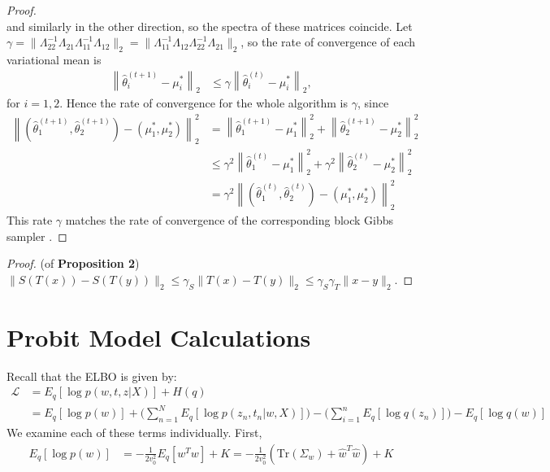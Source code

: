 \documentclass{article}
\begin{document}
\begin{proof}
$$$$
\noindent and similarly in the other direction, so the spectra of these matrices coincide. Let $\gamma = \|\Lambda_{22}^{-1}\Lambda_{21}\Lambda_{11}^{-1}\Lambda_{12}\|_2 = \|\Lambda_{11}^{-1}\Lambda_{12}\Lambda_{22}^{-1}\Lambda_{21}\|_2$, so the rate of convergence of each variational mean is
\begin{align}
\left\|\widehat\theta_i^{(t+1)} - \mu_i^*\right\|_2
&\le \gamma\left\|\widehat\theta_i^{(t)} - \mu_i^*\right\|_2,
\end{align}
for $i=1,2$. Hence the rate of convergence for the whole algorithm is $\gamma$, since
\begin{align}
\left\|(\widehat\theta_1^{(t+1)},\widehat\theta_2^{(t+1)})-(\mu_1^*,\mu_2^*)\right\|_2^2
&=\left\|\widehat\theta_1^{(t+1)}-\mu_1^*\right\|_2^2 + \left\|\widehat\theta_2^{(t+1)}-\mu_2^*\right\|_2^2\\
&\le \gamma^2\left\|\widehat\theta_1^{(t)}-\mu_1^*\right\|_2^2 + \gamma^2\left\|\widehat\theta_2^{(t)}-\mu_2^*\right\|_2^2 \\
&= \gamma^2\left\|(\widehat\theta_1^{(t)},\widehat\theta_2^{(t)})-(\mu_1^*,\mu_2^*)\right\|_2^2 
\end{align}
This rate $\gamma$ matches the rate of convergence of the corresponding block Gibbs sampler \cite{Sahu}.
\end{proof}


\begin{proof} (of {\bf Proposition 2}) $\|S(T(x))-S(T(y))\|_2\le \gamma_S\|T(x) - T(y)\|_2 \le \gamma_S\gamma_T\|x-y\|_2$.%
\end{proof}


\newpage


\section{Probit Model Calculations}
\label{vi}

 Recall that the ELBO is given by:
\begin{align}
\mathcal L &= E_q[\log p(w,t,z|X)] + H(q) \\
	&=  E_q[\log p(w)] + \Big(\sum_{n=1}^N E_q[\log p(z_n,t_n|w,X)]\Big) - \Big(\sum_{i=1}^n E_q[\log q(z_n)]\Big) - E_q[\log q(w)] 
\end{align} 
We examine each of these terms individually. First, 
\begin{align}
E_q[\log p(w)] &= -\frac{1}{2v_0^2} E_q[w^Tw] + K
	= -\frac{1}{2v_0^2} (\text{Tr}(\Sigma_w) + \hat w^T \hat w) + K
\end{align}
\end{document}
